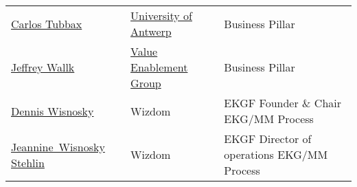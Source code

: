 \documentclass{whitepaper-style-doc}
\begin{document}
\begin{table}[ht]
\begin{tabular}{
        @{}
        p{0.30\freewidth}
        p{0.30\freewidth}
        p{0.30\freewidth}
        @{}
    }
        \href{https://www.linkedin.com/in/carlos-tubbax-975058118/}{Carlos Tubbax} & \href{https://www.uantwerpen.be/en/staff/carlos-tubbax/}{University of Antwerp} & Business Pillar \\
        \href{https://www.linkedin.com/in/jeffreywallk/}{Jeffrey Wallk} & \href{https://www.enablingvalue.com}{Value Enablement Group} & Business Pillar \\
        \href{https://www.linkedin.com/in/denniswisnosky/}{Dennis Wisnosky} & Wizdom & EKGF Founder \& Chair \newline EKG/MM Process \\
        \href{}{Jeannine~Wisnosky Stehlin} & Wizdom & EKGF Director of operations \newline EKG/MM Process \\
        \bottomrule
    \end{tabular}
\end{table}
\end{document}
